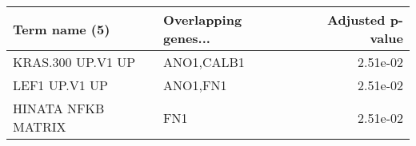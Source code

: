 \begin{tabular}{llr}
\toprule
     Term name (5) & Overlapping genes... &  Adjusted p-value \\
\midrule
 KRAS.300 UP.V1 UP &           ANO1,CALB1 &          2.51e-02 \\
     LEF1 UP.V1 UP &             ANO1,FN1 &          2.51e-02 \\
HINATA NFKB MATRIX &                  FN1 &          2.51e-02 \\
\bottomrule
\end{tabular}
